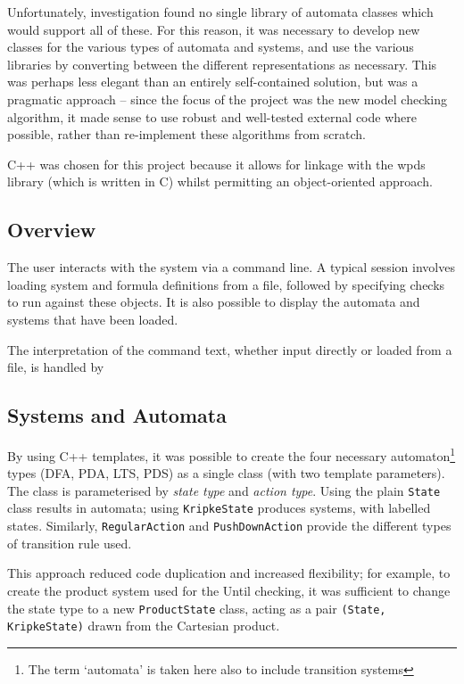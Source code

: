 \documentclass[11pt]{article}
\theoremstyle{definition}
\begin{document}
Unfortunately, investigation found no single library of automata classes which
would support all of these. For this reason, it was necessary to develop new
classes for the various types of automata and systems, and use the various
libraries by converting between the different representations as necessary.
This was perhaps less elegant than an entirely self-contained solution, but was
a pragmatic approach -- since the focus of the project was the new model
checking algorithm, it made sense to use robust and well-tested external code
where possible, rather than re-implement these algorithms from scratch.


C++ was chosen for this project because it allows for linkage with the wpds
library (which is written in C) whilst permitting an object-oriented approach.

\subsection{Overview}

The user interacts with the system via a command line. A typical session
involves loading system and formula definitions from a file, followed by
specifying checks to run against these objects. It is also possible to display
the automata and systems that have been loaded.

The interpretation of the command text, whether input directly or loaded from a file, is handled by 



\subsection{Systems and Automata}

By using C++ templates, it was possible to create the four necessary
automaton\footnote{The term `automata' is taken here also to include transition
systems} types (DFA, PDA, LTS, PDS) as a single class (with two template
parameters).  The class is parameterised by \textit{state type} and
\textit{action type}.  Using the plain \texttt{State} class results in
automata; using \texttt{KripkeState} produces systems, with labelled states.
Similarly, \texttt{RegularAction} and \texttt{PushDownAction} provide the
different types of transition rule used.

This approach reduced code duplication and increased flexibility; for example,
to create the product system used for the Until checking, it was sufficient to
change the state type to a new \texttt{ProductState} class, acting as a pair
\texttt{(State, KripkeState)} drawn from the Cartesian product.
\end{document}
